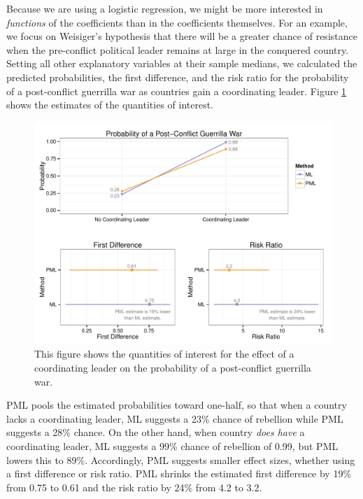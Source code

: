 \documentclass[12pt]{article}
\begin{document}
Because we are using a logistic regression, we might be more interested in \textit{functions} of the coefficients than in the coefficients themselves. 
For an example, we focus on Weisiger's hypothesis that there will be a greater chance of resistance when the pre-conflict political leader remains at large in the conquered country.
Setting all other explanatory variables at their sample medians, we calculated the predicted probabilities, the first difference, and the risk ratio for the probability of a post-conflict guerrilla war as countries gain a coordinating leader. 
Figure \ref{fig:weisiger-qis} shows the estimates of the quantities of interest.

\begin{figure}[h]
\begin{center}
\includegraphics[width = \textwidth]{figs/weisiger-qis.pdf}
\caption{This figure shows the quantities of interest for the effect of a coordinating leader on the probability of a post-conflict guerrilla war.}\label{fig:weisiger-qis}
\end{center}
\end{figure}

PML pools the estimated probabilities toward one-half, so that when a country lacks a coordinating leader, ML suggests a 23\% chance of rebellion while PML suggests a 28\% chance. 
On the other hand, when country \textit{does have} a coordinating leader, ML suggests a 99\% chance of rebellion of 0.99, but PML lowers this to 89\%. 
Accordingly, PML suggests smaller effect sizes, whether using a first difference or risk ratio. 
PML shrinks the estimated first difference by 19\% from 0.75 to 0.61 and the risk ratio by 24\% from 4.2 to 3.2.
\end{document}
